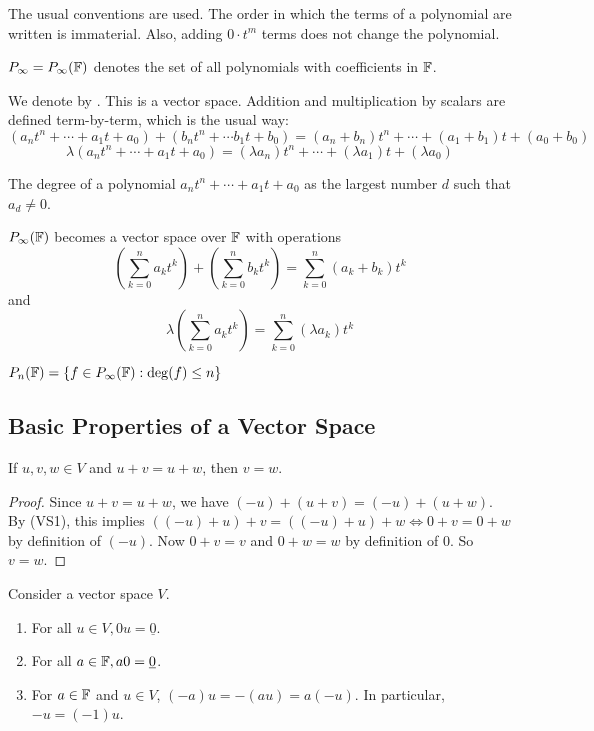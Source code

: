 The usual conventions are used. The order in which the terms of a polynomial are written is immaterial. Also, adding \(0\cdot t^m\) terms does not change the polynomial. 

\begin{mydef}\normalfont
\(P_\infty = P_\infty(\mathbb{F})\) denotes the set of all polynomials with coefficients in \(\mathbb{F}\).
\end{mydef}

We denote by . This is a vector space. Addition and multiplication by scalars are defined term-by-term, which is the usual way:
\[(a_n t^n+\dotsb+a_1 t+a_0) + (b_n t^n+\dotsb b_1 t + b_0) = (a_n + b_n)t^n+\dotsb+(a_1+b_1)t+(a_0+b_0)\]
\[\lambda(a_nt^n+\dotsb+a_1t+a_0) = (\lambda a_n)t^n+\dotsb+(\lambda a_1)t+(\lambda a_0)\]

\begin{mydef}\normalfont
The degree of a polynomial \(a_n t^n+\dotsb+a_1t+a_0\) as the largest number \(d\) such that \(a_d\ne 0\). 
\end{mydef}

\(P_\infty(\mathbb{F})\) becomes a vector space over \(\mathbb{F}\) with operations
\[\left(\sum_{k=0}^n{a_kt^k}\right) + \left(\sum_{k=0}^n b_kt^k\right) = \sum_{k=0}^n(a_k+b_k)t^k\]
%
and
%
\[\lambda\left(\sum_{k=0}^n a_kt^k\right) = \sum_{k=0}^n(\lambda a_k)t^k\]

\begin{mydef}
\(P_n(\mathbb{F}) = \{f\in P_\infty(\mathbb{F}) : \operatorname{deg}(f) \le n\}\)
\end{mydef}

\subsection{Basic Properties of a Vector Space}
\begin{mythm}\normalfont
If \(u,v,w\in V\) and \(u+v=u+w\), then \(v=w\).
\end{mythm}

\begin{proof}
Since \(u+v=u+w\), we have \((-u)+(u+v)=(-u)+(u+w)\). By (VS1), this implies \(((-u)+u)+v=((-u)+u)+w \Leftrightarrow 0+v=0+w\) by definition of \((-u)\). Now \(0+v=v\) and \(0+w=w\) by definition of \(0\). So \(v=w\).
\end{proof}

\begin{mythm}\normalfont 
	Consider a vector space \(V\).
	\begin{enumerate}
		\item For all \(u\in V, 0u=\underline{0}\).
		\item For all \(a\in \mathbb{F}, a0=\underline{0}\).
		\item For \(a\in\mathbb{F}\) and \(u\in V\), \((-a)u=-(au)=a(-u)\). In particular, \(-u=(-1)u\).
	\end{enumerate}
\end{mythm}

